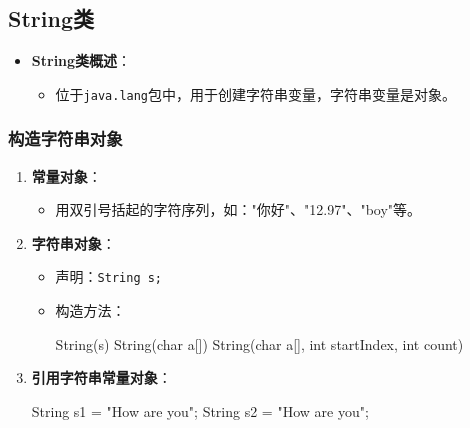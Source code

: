 \documentclass[a4paper, 10pt]{ctexart}
\begin{document}
\subsection{String类}
\begin{itemize}
  \item \textbf{String类概述}：
  \begin{itemize}
    \item 位于\texttt{java.lang}包中，用于创建字符串变量，字符串变量是对象。
  \end{itemize}
\end{itemize}

\subsubsection{构造字符串对象}
\begin{enumerate}
  \item \textbf{常量对象}：
  \begin{itemize}
    \item 用双引号括起的字符序列，如："你好"、"12.97"、"boy"等。
  \end{itemize}
  \item \textbf{字符串对象}：
  \begin{itemize}
    \item 声明：\texttt{String s;}
    \item 构造方法：
    \begin{codeblock}
String(s)
String(char a[])
String(char a[], int startIndex, int count)
    \end{codeblock}
  \end{itemize}
  \item \textbf{引用字符串常量对象}：
  \begin{codeblock}
String s1 = "How are you";
String s2 = "How are you";
  \end{codeblock}
\end{enumerate}
\end{document}
